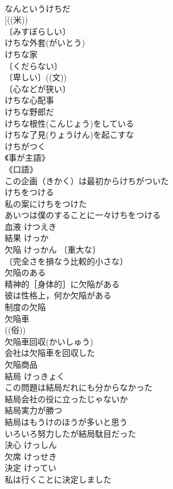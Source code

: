 \documentclass[8pt]{extreport}
\begin{document}
\begin{CJK}{UTF8}{min}
\\	なんというけちだ 
\\	[((米))
\\	〔みすぼらしい〕
\\	けちな外套(がいとう) 
\\	けちな家 
\\	〔くだらない〕
\\	〔卑しい〕((文)) 
\\	〔心などが狭い〕
\\	けちな心配事 
\\	けちな野郎だ 
\\	けちな根性(こんじょう)をしている 
\\	けちな了見(りょうけん)を起こすな 
\\	けちがつく　
\\	《事が主語》 
\\	《口語》 
\\	この企画（きかく）は最初からけちがついた 
\\	けちをつける　 
\\	私の案にけちをつけた 
\\	あいつは僕のすることに一々けちをつける 
\\	血液	けつえき	
\\	結果	けっか	
\\	欠陥	けっかん	〔重大な〕
\\	〔完全さを損なう比較的小さな〕
\\	欠陥のある 
\\	精神的［身体的］に欠陥がある 
\\	彼は性格上，何か欠陥がある 
\\	制度の欠陥 
\\	欠陥車 
\\	((俗)) 
\\	欠陥車回収(かいしゅう) 
\\	会社は欠陥車を回収した 
\\	欠陥商品 
\\	結局	けっきょく	
\\	この問題は結局だれにも分からなかった 
\\	結局会社の役に立ったじゃないか 
\\	結局実力が勝つ 
\\	結局はもうけのほうが多いと思う 
\\	いろいろ努力したが結局駄目だった 
\\	決心	けっしん	
\\	欠席	けっせき	
\\	決定	けってい	
\\	私は行くことに決定しました 

\end{CJK}
\end{document}
